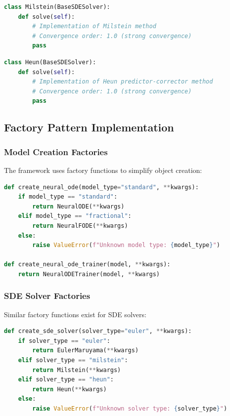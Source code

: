 \vspace{0.5em}

\begin{lstlisting}[language=Python, caption=Milstein Implementation]
class Milstein(BaseSDESolver):
    def solve(self):
        # Implementation of Milstein method
        # Convergence order: 1.0 (strong convergence)
        pass
\end{lstlisting}

\vspace{0.5em}

\begin{lstlisting}[language=Python, caption=Heun Implementation]
class Heun(BaseSDESolver):
    def solve(self):
        # Implementation of Heun predictor-corrector method
        # Convergence order: 1.0 (strong convergence)
        pass
\end{lstlisting}

\subsection{Factory Pattern Implementation}

\subsubsection{Model Creation Factories}

The framework uses factory functions to simplify object creation:

\begin{lstlisting}[language=Python, caption=Neural ODE Factory Functions]
def create_neural_ode(model_type="standard", **kwargs):
    if model_type == "standard":
        return NeuralODE(**kwargs)
    elif model_type == "fractional":
        return NeuralFODE(**kwargs)
    else:
        raise ValueError(f"Unknown model type: {model_type}")

def create_neural_ode_trainer(model, **kwargs):
    return NeuralODETrainer(model, **kwargs)
\end{lstlisting}

\subsubsection{SDE Solver Factories}

Similar factory functions exist for SDE solvers:

\begin{lstlisting}[language=Python, caption=SDE Solver Factory Functions]
def create_sde_solver(solver_type="euler", **kwargs):
    if solver_type == "euler":
        return EulerMaruyama(**kwargs)
    elif solver_type == "milstein":
        return Milstein(**kwargs)
    elif solver_type == "heun":
        return Heun(**kwargs)
    else:
        raise ValueError(f"Unknown solver type: {solver_type}")
\end{lstlisting}

